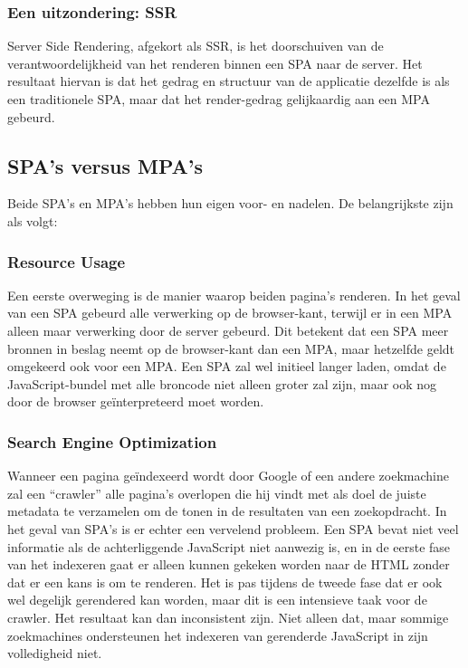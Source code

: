 \subsubsection{Een uitzondering: SSR}

Server Side Rendering, afgekort als SSR, is het doorschuiven van de verantwoordelijkheid van het renderen binnen een SPA naar de server. Het resultaat hiervan is dat het gedrag en structuur van de applicatie dezelfde is als een traditionele SPA, maar dat het render-gedrag gelijkaardig aan een MPA gebeurd.

\subsection{SPA's versus MPA's}

Beide SPA's en MPA's hebben hun eigen voor- en nadelen. De belangrijkste zijn als volgt:

\subsubsection{Resource Usage}

Een eerste overweging is de manier waarop beiden pagina's renderen. In het geval van een SPA gebeurd alle verwerking op de browser-kant, terwijl er in een MPA alleen maar verwerking door de server gebeurd. Dit betekent dat een SPA meer bronnen in beslag neemt op de browser-kant dan een MPA, maar hetzelfde geldt omgekeerd ook voor een MPA. Een SPA zal wel initieel langer laden, omdat de JavaScript-bundel met alle broncode niet alleen groter zal zijn, maar ook nog door de browser geïnterpreteerd moet worden.

\subsubsection{Search Engine Optimization}

Wanneer een pagina geïndexeerd wordt door Google of een andere zoekmachine zal een ``crawler'' alle pagina's overlopen die hij vindt met als doel de juiste metadata te verzamelen om de tonen in de resultaten van een zoekopdracht. In het geval van SPA's is er echter een vervelend probleem. Een SPA bevat niet veel informatie als de achterliggende JavaScript niet aanwezig is, en in de eerste fase van het indexeren gaat er alleen kunnen gekeken worden naar de HTML zonder dat er een kans is om te renderen. Het is pas tijdens de tweede fase dat er ook wel degelijk gerendered kan worden, maar dit is een intensieve taak voor de crawler. Het resultaat kan dan inconsistent zijn. Niet alleen dat, maar sommige zoekmachines ondersteunen het indexeren van gerenderde JavaScript in zijn volledigheid niet. \autocite{cartland_2021}

